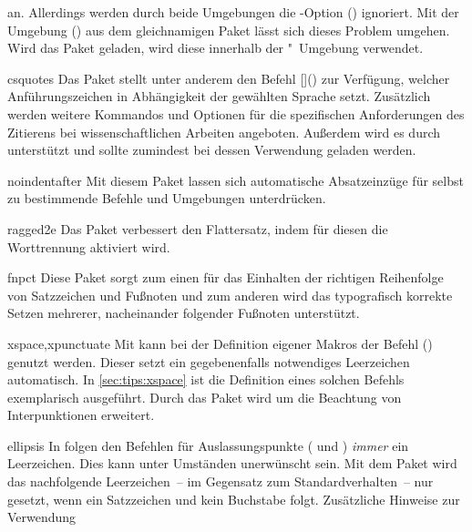 \begin{packages}
  an. Allerdings werden durch beide Umgebungen die \KOMAScript-Option 
  () ignoriert. Mit der Umgebung 
  () aus dem gleichnamigen Paket lässt 
  sich dieses Problem umgehen. Wird das Paket geladen, wird diese innerhalb der 
  "~Umgebung verwendet.
\item[csquotes]
  Das Paket stellt unter anderem den Befehl 
  []() zur Verfügung, welcher 
  Anführungszeichen in Abhängigkeit der gewählten Sprache setzt. Zusätzlich 
  werden weitere Kommandos und Optionen für die spezifischen Anforderungen des 
  Zitierens bei wissenschaftlichen Arbeiten angeboten. Außerdem wird es durch 
   unterstützt und sollte zumindest bei dessen Verwendung 
  geladen werden.
\item[noindentafter]
  Mit diesem Paket lassen sich automatische Absatzeinzüge für selbst zu 
  bestimmende Befehle und Umgebungen unterdrücken.
\item[ragged2e]
  Das Paket verbessert den Flattersatz, indem für diesen die Worttrennung 
  aktiviert wird.
\item[fnpct]
  Diese Paket sorgt zum einen für das Einhalten der richtigen Reihenfolge von 
  Satzzeichen und Fußnoten und zum anderen wird das typografisch korrekte 
  Setzen mehrerer, nacheinander folgender Fußnoten unterstützt. 
\item[xspace,xpunctuate]
  Mit  kann bei der Definition eigener Makros der Befehl 
  () genutzt werden. Dieser setzt ein 
  gegebenenfalls notwendiges Leerzeichen automatisch. In 
  \autoref{sec:tips:xspace} ist die Definition eines solchen Befehls 
  exemplarisch ausgeführt. Durch das Paket  wird 
   um die Beachtung von Interpunktionen erweitert.
\item[ellipsis]
  In  folgen den Befehlen für Auslassungspunkte ( und 
  ) \emph{immer} ein Leerzeichen. Dies kann unter Umständen 
  unerwünscht sein. Mit dem Paket  wird das nachfolgende 
  Leerzeichen~-- im Gegensatz zum Standardverhalten~-- nur gesetzt, wenn ein 
  Satzzeichen und kein Buchstabe folgt. Zusätzliche Hinweise zur Verwendung 

\end{packages}
